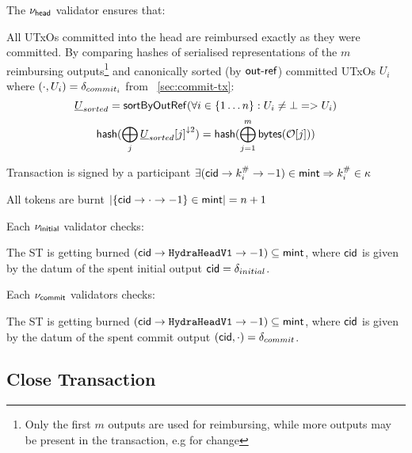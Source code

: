 \noindent The $\nu_\mathsf{head}$ validator ensures that:
\begin{menumerate}
  \item All UTxOs committed into the head are reimbursed exactly as they were
  committed. By comparing hashes of serialised representations of the $m$
  reimbursing outputs\footnote{Only the first $m$ outputs are used for
    reimbursing, while more outputs may be present in the transaction, e.g for
    change} and canonically sorted (by $\mathsf{out\textsf{-}{}ref}$) committed UTxOs $U_{i}$ where $(\cdot, U_{i}) = \delta_{commit_{i}}$ from \mtxCom{}~\ref{sec:commit-tx}:
  \[
    \underline{U}_{sorted} = \mathsf{sortByOutRef} ( \forall i \in \{1\dots n\} : U_{i} \neq \bot => U_{i})
  \]
  \[
    \mathsf{hash}(\bigoplus_{j}{\underline{U}_{sorted}[j]}^{\downarrow 2}) = \mathsf{hash}(\bigoplus_{j=1}^{m} \mathsf{bytes}(\mathcal{O}[j]))
  \]

  \item Transaction is signed by a participant $\exists (\mathsf{cid} \rightarrow k^{\#}_{i} \rightarrow -1) \in \mathsf{mint} \Rightarrow k^{\#}_{i} \in \kappa$
  \item All tokens are burnt
  $|\{\mathsf{cid} \rightarrow \cdot \rightarrow -1\} \in \mathsf{mint}| = n + 1$
\end{menumerate}

\noindent Each $\nu_\mathsf{initial}$ validator checks:
\begin{menumerate}
  \item The ST is getting burned
  $(\mathsf{cid} \rightarrow \texttt{HydraHeadV1} \rightarrow -1) \subseteq \mathsf{mint}$,
  where $\mathsf{cid}$ is given by the datum of the spent initial output
  $\mathsf{cid} = \delta_{initial}$.
\end{menumerate}

\noindent Each $\nu_\mathsf{commit}$ validators checks:
\begin{menumerate}
  \item The ST is getting burned
  $(\mathsf{cid} \rightarrow \texttt{HydraHeadV1} \rightarrow -1) \subseteq \mathsf{mint}$,
  where $\mathsf{cid}$ is given by the datum of the spent commit output $(\mathsf{cid},\cdot) = \delta_{commit}$.
\end{menumerate}

\subsection{Close Transaction}\label{sec:close-tx}




